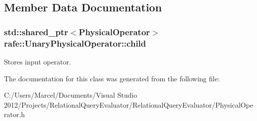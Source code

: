 \subsection{Member Data Documentation}
\hypertarget{classrafe_1_1_unary_physical_operator_a4aecf29ff3b6c81c861cd5e57473fe4c}{
\subsubsection[{child}]{\setlength{\rightskip}{0pt plus 5cm}std\+::shared\+\_\+ptr$<${\bf Physical\+Operator}$>$ rafe\+::\+Unary\+Physical\+Operator\+::child}}\label{classrafe_1_1_unary_physical_operator_a4aecf29ff3b6c81c861cd5e57473fe4c}
Stores input operator. 

The documentation for this class was generated from the following file\+:\begin{DoxyCompactItemize}
\item 
C\+:/\+Users/\+Marcel/\+Documents/\+Visual Studio 2012/\+Projects/\+Relational\+Query\+Evaluator/\+Relational\+Query\+Evaluator/Physical\+Operator.\+h\end{DoxyCompactItemize}
